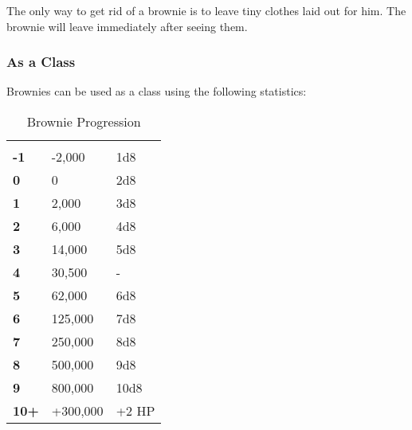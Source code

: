 \begin{multicols*}{2}
The only way to get rid of a brownie is to leave tiny clothes laid out for him. The brownie will leave immediately after seeing them.

\subsubsection{As a Class}
Brownies can be used as a class using the following statistics:


\begin {table}[H]
  \caption{Brownie Progression}
  \begin{tabularx}{\columnwidth}{>{\bfseries}YYY}
	 &  & \\
	-1 & -2,000 & 1d8\\
	0 & 0 & 2d8\\
	1 & 2,000 & 3d8\\
	2 & 6,000 & 4d8\\
	3 & 14,000 & 5d8\\
	4 & 30,500 & -\\
	5 & 62,000 & 6d8\\
	6 & 125,000 & 7d8\\
	7 & 250,000 & 8d8\\
	8 & 500,000 & 9d8\\
	9 & 800,000 & 10d8\\
	10+ & +300,000 & +2 HP
  \end {tabularx}
\end {table}


\end{multicols*}
